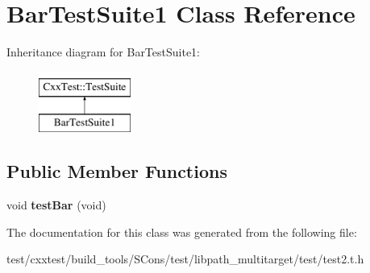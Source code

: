 \hypertarget{classBarTestSuite1}{\section{Bar\-Test\-Suite1 Class Reference}
\label{classBarTestSuite1}
}
Inheritance diagram for Bar\-Test\-Suite1\-:\begin{figure}[H]
\begin{center}
\leavevmode
\includegraphics[height=2.000000cm]{classBarTestSuite1}
\end{center}
\end{figure}
\subsection*{Public Member Functions}
\begin{DoxyCompactItemize}
\item 
\hypertarget{classBarTestSuite1_a8d503aeca0b35c2aafc7e59be68b20df}{void {\bfseries test\-Bar} (void)}\label{classBarTestSuite1_a8d503aeca0b35c2aafc7e59be68b20df}

\end{DoxyCompactItemize}


The documentation for this class was generated from the following file\-:\begin{DoxyCompactItemize}
\item 
test/cxxtest/build\-\_\-tools/\-S\-Cons/test/libpath\-\_\-multitarget/test/test2.\-t.\-h\end{DoxyCompactItemize}
